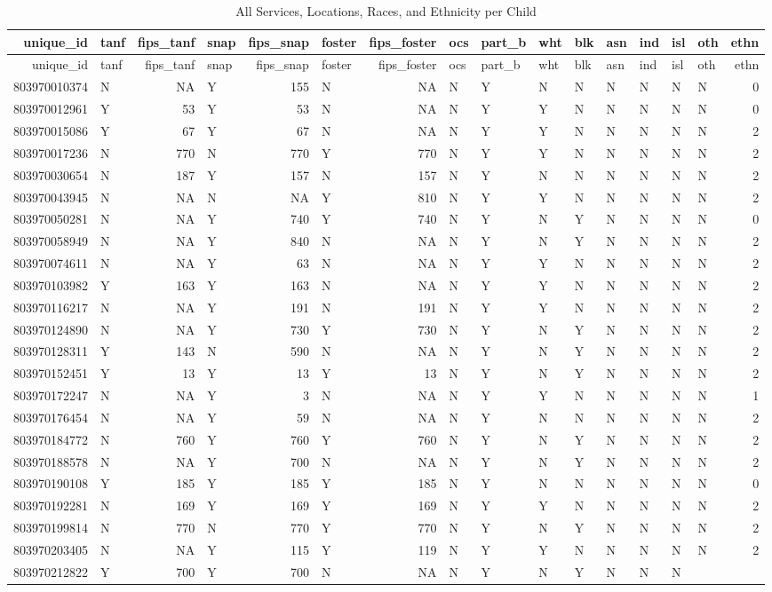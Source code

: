 \documentclass[]{article}
\begin{document}
\begin{longtable}[]{@{}rlrlrlrllllllllr@{}}
\caption{All Services, Locations, Races, and Ethnicity per
Child}\tabularnewline
\toprule
unique\_id & tanf & fips\_tanf & snap & fips\_snap & foster &
fips\_foster & ocs & part\_b & wht & blk & asn & ind & isl & oth &
ethn\tabularnewline
\midrule
\endfirsthead
\toprule
unique\_id & tanf & fips\_tanf & snap & fips\_snap & foster &
fips\_foster & ocs & part\_b & wht & blk & asn & ind & isl & oth &
ethn\tabularnewline
\midrule
\endhead
803970010374 & N & NA & Y & 155 & N & NA & N & Y & N & N & N & N & N & N
& 0\tabularnewline
803970012961 & Y & 53 & Y & 53 & N & NA & N & Y & Y & N & N & N & N & N
& 0\tabularnewline
803970015086 & Y & 67 & Y & 67 & N & NA & N & Y & Y & N & N & N & N & N
& 2\tabularnewline
803970017236 & N & 770 & N & 770 & Y & 770 & N & Y & Y & N & N & N & N &
N & 2\tabularnewline
803970030654 & N & 187 & Y & 157 & N & 157 & N & Y & N & N & N & N & N &
N & 2\tabularnewline
803970043945 & N & NA & N & NA & Y & 810 & N & Y & Y & N & N & N & N & N
& 2\tabularnewline
803970050281 & N & NA & Y & 740 & Y & 740 & N & Y & N & Y & N & N & N &
N & 0\tabularnewline
803970058949 & N & NA & Y & 840 & N & NA & N & Y & N & Y & N & N & N & N
& 2\tabularnewline
803970074611 & N & NA & Y & 63 & N & NA & N & Y & Y & N & N & N & N & N
& 2\tabularnewline
803970103982 & Y & 163 & Y & 163 & N & NA & N & Y & Y & N & N & N & N &
N & 2\tabularnewline
803970116217 & N & NA & Y & 191 & N & 191 & N & Y & Y & N & N & N & N &
N & 2\tabularnewline
803970124890 & N & NA & Y & 730 & Y & 730 & N & Y & N & Y & N & N & N &
N & 2\tabularnewline
803970128311 & Y & 143 & N & 590 & N & NA & N & Y & N & Y & N & N & N &
N & 2\tabularnewline
803970152451 & Y & 13 & Y & 13 & Y & 13 & N & Y & N & Y & N & N & N & N
& 2\tabularnewline
803970172247 & N & NA & Y & 3 & N & NA & N & Y & Y & N & N & N & N & N &
1\tabularnewline
803970176454 & N & NA & Y & 59 & N & NA & N & Y & N & N & N & N & N & N
& 2\tabularnewline
803970184772 & N & 760 & Y & 760 & Y & 760 & N & Y & N & Y & N & N & N &
N & 2\tabularnewline
803970188578 & N & NA & Y & 700 & N & NA & N & Y & N & Y & N & N & N & N
& 2\tabularnewline
803970190108 & Y & 185 & Y & 185 & Y & 185 & N & Y & N & N & N & N & N &
N & 0\tabularnewline
803970192281 & N & 169 & Y & 169 & Y & 169 & N & Y & Y & N & N & N & N &
N & 2\tabularnewline
803970199814 & N & 770 & N & 770 & Y & 770 & N & Y & N & Y & N & N & N &
N & 2\tabularnewline
803970203405 & N & NA & Y & 115 & Y & 119 & N & Y & Y & N & N & N & N &
N & 2\tabularnewline
803970212822 & Y & 700 & Y & 700 & N & NA & N & Y & N & Y & N & N & N &

\end{longtable}
\end{document}
